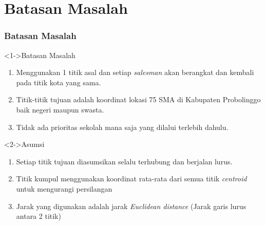 \section{Batasan Masalah}
\begin{frame}
\frametitle{Batasan Masalah}

\begin{block}<1->{Batasan Masalah}
\begin{enumerate}
\item Menggunakan 1 titik asal dan setiap \textit{salesman} akan berangkat dan kembali pada titik kota yang sama.
\item Titik-titik tujuan adalah koordinat lokasi 75 SMA di Kabupaten Probolinggo baik negeri maupun swasta.
\item Tidak ada prioritas sekolah mana saja yang dilalui terlebih dahulu.
\end{enumerate}
\end{block}
\begin{block}<2->{Asumsi}
\begin{enumerate}
\item Setiap titik tujuan diasumsikan selalu terhubung dan berjalan lurus.
\item Titik kumpul menggunakan koordinat rata-rata dari semua titik \textit{centroid} untuk mengurangi persilangan
\item Jarak yang digunakan adalah jarak \textit{Euclidean distance} (Jarak garis lurus antara 2 titik)
\end{enumerate}
\end{block}
\end{frame}